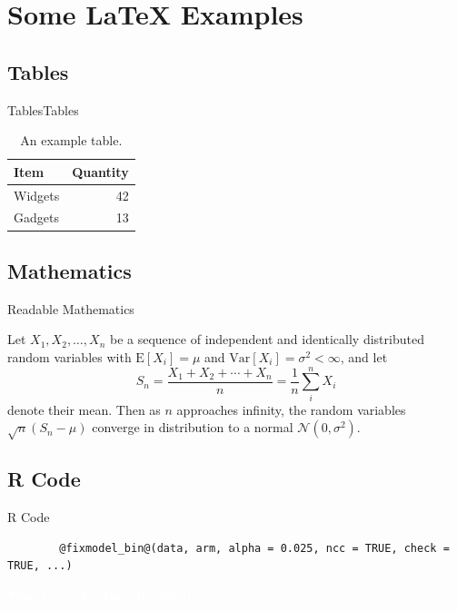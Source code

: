 \documentclass[10pt]{beamer} %
\begin{document}
\section{Some \LaTeX{} Examples}
\subsection{Tables}

\begin{frame}{Tables}{Tables}

\begin{table}
\centering
\begin{tabular}{l|r}
Item & Quantity \\\hline
Widgets & 42 \\
Gadgets & 13
\end{tabular}
\caption{\label{tab:widgets}An example table.}
\end{table}

\end{frame}

\subsection{Mathematics}

\begin{frame}{Readable Mathematics}

Let $X_1, X_2, \ldots, X_n$ be a sequence of independent and identically distributed random variables with $\text{E}[X_i] = \mu$ and $\text{Var}[X_i] = \sigma^2 < \infty$, and let
$$S_n = \frac{X_1 + X_2 + \cdots + X_n}{n}
      = \frac{1}{n}\sum_{i}^{n} X_i$$
denote their mean. Then as $n$ approaches infinity, the random variables $\sqrt{n}(S_n - \mu)$ converge in distribution to a normal $\mathcal{N}(0, \sigma^2)$.

\end{frame}

\subsection{R Code}

\begin{frame}[fragile]{R Code}
	
	\begin{lstlisting}
		@fixmodel_bin@(data, arm, alpha = 0.025, ncc = TRUE, check = TRUE, ...)
	\end{lstlisting}  
	
\end{frame}



{\titlepageBluenNoFootline
	\begin{frame}
		
		\begin{center}
			\Large\textcolor{white}{\textbf{Thank you for the attention!}}
		\end{center}
		
	\end{frame}	
}
\end{document}
